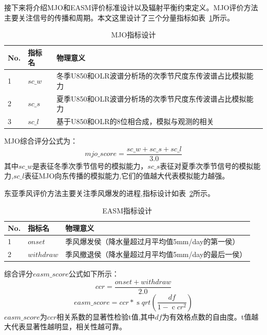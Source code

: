 接下来将介绍MJO和EASM评价标准设计以及辐射平衡约束定义。MJO评价方法主要关注信号的传播和周期。本文这里设计了三个分量指标如表~\ref{tab:mjometrics}所示。
\begin{table}[H]
\centering
\caption{MJO指标设计}  
\begin{tabular}{lll}  
\toprule[1.5pt]
\centering
No. & 指标名 & 物理意义  \\  
\hline  
    1        & $sc\_w$    & 冬季U850和OLR波谱分析场的次季节尺度东传波谱占比模拟能力 \\
    2        & $sc\_s$ & 夏季U850和OLR波谱分析场的次季节尺度东传波谱占比模拟能力 \\
    3        & $sc\_l$    &基于U850和OLR的8位相合成，模拟与观测的相关 \\
\bottomrule[1.5pt]  
\end{tabular} 
\label{tab:mjometrics}
\end{table}

MJO综合评分公式为：
\begin{equation}
\label{mjoeq}
 mjo\_score =  \frac {sc\_w + sc\_s + sc\_l}  {3.0}   
\end{equation}
其中$sc\_w$是表征冬季次季节信号的模拟能力，$sc\_s$表征对夏季次季节信号的模拟能力,$sc\_l$表征MJO向东传播的模拟能力,它们的值越大代表模拟能力越强。

东亚季风评价方法主要关注季风爆发的进程,指标设计如表~\ref{tab:easmmetrics}所示。
\begin{table}[H]
\centering
\caption{EASM指标设计}  
\begin{tabular}{lll}  
\toprule[1.5pt]
\centering
No. & 指标名 & 物理意义  \\  
\hline  
    1        & $onset$    & 季风爆发侯（降水量超过月平均值5mm/day的第一侯） \\
    2        & $withdraw$ & 季风撤退侯（降水量超过月平均值5mm/day的最后一侯） \\
\bottomrule[1.5pt]  
\end{tabular}  
\label{tab:easmmetrics}
\end{table}

综合评分$easm\_score$公式如下所示：
\begin{equation}
ccr = \frac {onset + withdraw} {2.0}    
\end{equation}
\begin{equation}
easm\_score = {ccr} * \operatorname sqrt  (\frac {  df  }  {1 - \operatorname  ccr  ^  2})    
\end{equation}
$easm\_score$为$ccr$相关系数的显著性检验t值,其中$df$为有效格点数的自由度。t值越大代表显著性越明显，相关性越可靠。

